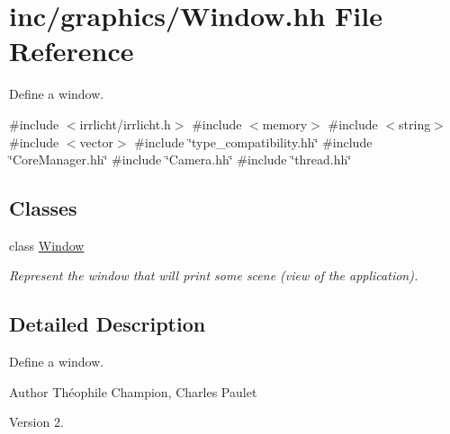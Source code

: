\hypertarget{Window_8hh}{}\section{inc/graphics/\+Window.hh File Reference}
\label{Window_8hh}


Define a window.  


{\ttfamily \#include $<$irrlicht/irrlicht.\+h$>$}\newline
{\ttfamily \#include $<$memory$>$}\newline
{\ttfamily \#include $<$string$>$}\newline
{\ttfamily \#include $<$vector$>$}\newline
{\ttfamily \#include \char`\"{}type\+\_\+compatibility.\+hh\char`\"{}}\newline
{\ttfamily \#include \char`\"{}Core\+Manager.\+hh\char`\"{}}\newline
{\ttfamily \#include \char`\"{}Camera.\+hh\char`\"{}}\newline
{\ttfamily \#include \char`\"{}thread.\+hh\char`\"{}}\newline
\subsection*{Classes}
\begin{DoxyCompactItemize}
\item 
class \hyperlink{classWindow}{Window}
\begin{DoxyCompactList}\small\item\em Represent the window that will print some scene (view of the application). \end{DoxyCompactList}\end{DoxyCompactItemize}


\subsection{Detailed Description}
Define a window. 

\begin{DoxyAuthor}{Author}
Théophile Champion, Charles Paulet 
\end{DoxyAuthor}
\begin{DoxyVersion}{Version}
2. 
\end{DoxyVersion}
